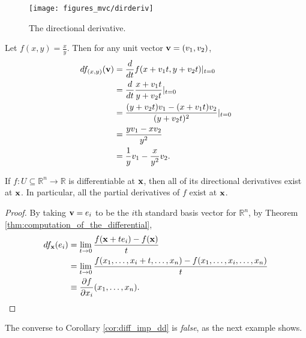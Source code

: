 \documentclass[12pt,letterpaper,reqno]{article}
\numberwithin{equation}{section}
\newcommand{\R}{\ensuremath{\mathbb R}}
\newcommand{\bv}{{\bf v}}
\newcommand{\bx}{{\bf x}}
\begin{document}
{\begin{figure}[h]
	\centering
	\texttt{[image: figures\_mvc/dirderiv]}
	\caption{The directional derivative.}
\end{figure}

\begin{example}
Let $f(x,y)=\frac{x}{y}$. Then for any unit vector $\bv=(v_1,v_2)$,
\begin{align*}
	df_{(x,y)}(\bv)&=\frac{d}{dt}f(x+v_1t,y+v_2t)|_{t=0} \\
	&=\frac{d}{dt}\frac{x+v_1t}{y+v_2t}|_{t=0} \\
	&=\frac{(y+v_2t)v_1-(x+v_1t)v_2}{(y+v_2t)^2}|_{t=0}\\
	&=\frac{yv_1-xv_2}{y^2} \\
	&=\frac{1}{y}v_1-\frac{x}{y^2}v_2.
\end{align*}	
\end{example}


\begin{cor}\label{cor:diff_imp_dd}
If $f:U \subseteq \R^n \to \R$ is differentiable at $\bx$, then all of its directional derivatives exist at $\bx$. In particular, all the partial derivatives of $f$ exist at $\bx$.	
\end{cor}

\begin{proof}
	By taking $\bv=e_i$ to be the $i$th standard basis vector for $\R^n$, by Theorem \ref{thm:computation_of_the_differential},
	\begin{align*}
		df_\bx(e_i)&=\lim_{t \to 0}\frac{f(\bx+te_i)-f(\bx)}{t}\\
		&=\lim_{t \to 0}\frac{f(x_1,\dots,x_i+t,\dots,x_n)-f(x_1,\dots,x_i,\dots,x_n)}{t}\\
		&\equiv \frac{\partial f}{\partial x_i}(x_1,\dots,x_n).
	\end{align*}
\end{proof}

The converse to Corollary \ref{cor:diff_imp_dd} is \emph{false}, as the next example shows.

}
\end{document}
